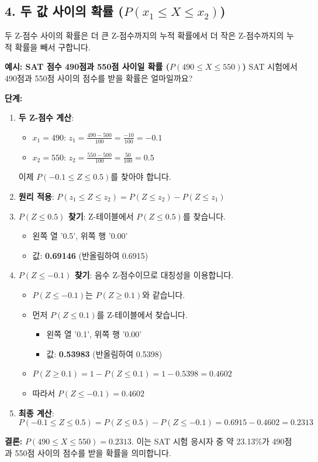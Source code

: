 \documentclass[11pt,a4paper]{article}
\theoremstyle{definition}
\begin{document}
\subsection{4. 두 값 사이의 확률 ($P(x_1 \le X \le x_2)$)}
두 Z-점수 사이의 확률은 더 큰 Z-점수까지의 누적 확률에서 더 작은 Z-점수까지의 누적 확률을 빼서 구합니다.

\begin{examplebox}
\textbf{예시: SAT 점수 490점과 550점 사이일 확률 ($P(490 \le X \le 550)$)}
SAT 시험에서 490점과 550점 사이의 점수를 받을 확률은 얼마일까요?

\textbf{단계:}
\begin{enumerate}
    \item \textbf{두 Z-점수 계산}:
    \begin{itemize}
        \item $x_1 = 490$: $z_1 = \frac{490 - 500}{100} = \frac{-10}{100} = -0.1$
        \item $x_2 = 550$: $z_2 = \frac{550 - 500}{100} = \frac{50}{100} = 0.5$
    \end{itemize}
    이제 $P(-0.1 \le Z \le 0.5)$를 찾아야 합니다.
    \item \textbf{원리 적용}: $P(z_1 \le Z \le z_2) = P(Z \le z_2) - P(Z \le z_1)$
    \item \textbf{$P(Z \le 0.5)$ 찾기}: Z-테이블에서 $P(Z \le 0.5)$를 찾습니다.
    \begin{itemize}
        \item 왼쪽 열 '0.5', 위쪽 행 '0.00'
        \item 값: \textbf{0.69146} (반올림하여 0.6915)
    \end{itemize}
    \item \textbf{$P(Z \le -0.1)$ 찾기}: 음수 Z-점수이므로 대칭성을 이용합니다.
    \begin{itemize}
        \item $P(Z \le -0.1)$는 $P(Z \ge 0.1)$와 같습니다.
        \item 먼저 $P(Z \le 0.1)$를 Z-테이블에서 찾습니다.
            \begin{itemize}
                \item 왼쪽 열 '0.1', 위쪽 행 '0.00'
                \item 값: \textbf{0.53983} (반올림하여 0.5398)
            \end{itemize}
        \item $P(Z \ge 0.1) = 1 - P(Z \le 0.1) = 1 - 0.5398 = 0.4602$
        \item 따라서 $P(Z \le -0.1) = 0.4602$
    \end{itemize}
    \item \textbf{최종 계산}:
    \[ P(-0.1 \le Z \le 0.5) = P(Z \le 0.5) - P(Z \le -0.1) = 0.6915 - 0.4602 = 0.2313 \]
\end{enumerate}
\textbf{결론:} $P(490 \le X \le 550) = 0.2313$. 이는 SAT 시험 응시자 중 약 23.13\%가 490점과 550점 사이의 점수를 받을 확률을 의미합니다.


\end{examplebox}
\end{document}
